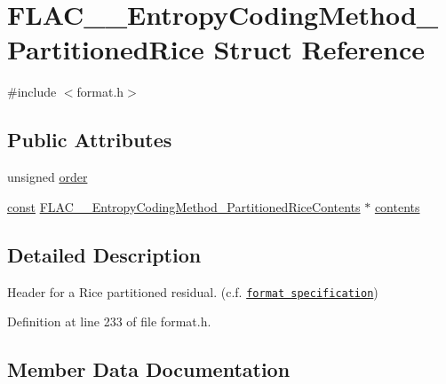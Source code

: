 \hypertarget{struct_f_l_a_c_____entropy_coding_method___partitioned_rice}{}\section{F\+L\+A\+C\+\_\+\+\_\+\+Entropy\+Coding\+Method\+\_\+\+Partitioned\+Rice Struct Reference}
\label{struct_f_l_a_c_____entropy_coding_method___partitioned_rice}


{\ttfamily \#include $<$format.\+h$>$}

\subsection*{Public Attributes}
\begin{DoxyCompactItemize}
\item 
unsigned \hyperlink{struct_f_l_a_c_____entropy_coding_method___partitioned_rice_a1e1c9049e31eab5113c245164b2c694a}{order}
\item 
\hyperlink{getopt1_8c_a2c212835823e3c54a8ab6d95c652660e}{const} \hyperlink{struct_f_l_a_c_____entropy_coding_method___partitioned_rice_contents}{F\+L\+A\+C\+\_\+\+\_\+\+Entropy\+Coding\+Method\+\_\+\+Partitioned\+Rice\+Contents} $\ast$ \hyperlink{struct_f_l_a_c_____entropy_coding_method___partitioned_rice_a2fbfa1bd5656bf620c0bb9f8ba77f579}{contents}
\end{DoxyCompactItemize}


\subsection{Detailed Description}
Header for a Rice partitioned residual. (c.\+f. \href{../format.html#partitioned_rice}{\tt format specification}) 

Definition at line 233 of file format.\+h.



\subsection{Member Data Documentation}
